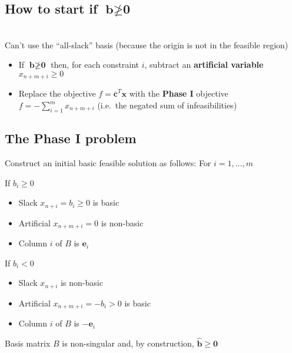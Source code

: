\documentclass[11pt,a4paper]{article}
\begin{document}
\subsection*{How to start if $\textbf{b} \ngeq \textbf{0}$}\\
Can't use the ``all-slack'' basis (because the origin is not in the feasible region)

\begin{itemize}

    \item If $\textbf{b} \ngeq \textbf{0}$ then, for each constraint $i$, subtract an
        \textbf{artificial variable} $x_{n+m+i} \geq 0$

    \item Replace the objective $f = \overline{\textbf{c}}^T\textbf{x}$ with the \textbf{Phase I}
        objective $f = - \sum^m_{i=1} x_{n+m+i}$ (i.e.\ the negated sum of infeasibilities)

\end{itemize}

\subsection*{The Phase I problem}

Construct an initial basic feasible solution as follows: For $i = 1, \ldots, m$

If $b_i \geq 0$
\begin{itemize}
    \item Slack $x_{n+i} = b_i \geq 0$ is basic
    \item Artificial $x_{n+m+i} = 0$ is non-basic
    \item Column $i$ of $B$ is $\textbf{e}_i$
\end{itemize}

If $b_i < 0$
\begin{itemize}
    \item Slack $x_{n+i}$ is non-basic
    \item Artificial $x_{n+m+i} = -b_i > 0$ is basic
    \item Column $i$ of $B$ is $-\textbf{e}_i$
\end{itemize}

Basis matrix $B$ is non-singular and, by construction, $\widehat{\textbf{b}} \geq \textbf{0}$
\end{document}
